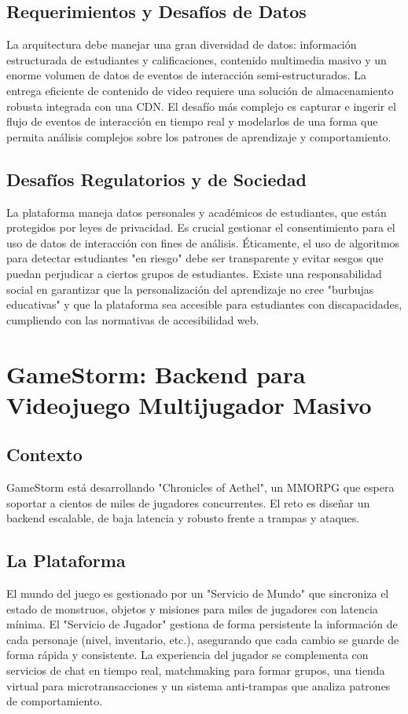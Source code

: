 \documentclass[12pt]{article}
\begin{document}
\subsection{Requerimientos y Desafíos de Datos}
La arquitectura debe manejar una gran diversidad de datos: información estructurada de estudiantes y calificaciones, contenido multimedia masivo y un enorme volumen de datos de eventos de interacción semi-estructurados. La entrega eficiente de contenido de video requiere una solución de almacenamiento robusta integrada con una CDN. El desafío más complejo es capturar e ingerir el flujo de eventos de interacción en tiempo real y modelarlos de una forma que permita análisis complejos sobre los patrones de aprendizaje y comportamiento.

\subsection{Desafíos Regulatorios y de Sociedad}
La plataforma maneja datos personales y académicos de estudiantes, que están protegidos por leyes de privacidad. Es crucial gestionar el consentimiento para el uso de datos de interacción con fines de análisis. Éticamente, el uso de algoritmos para detectar estudiantes "en riesgo" debe ser transparente y evitar sesgos que puedan perjudicar a ciertos grupos de estudiantes. Existe una responsabilidad social en garantizar que la personalización del aprendizaje no cree "burbujas educativas" y que la plataforma sea accesible para estudiantes con discapacidades, cumpliendo con las normativas de accesibilidad web.

\newpage

\section{GameStorm: Backend para Videojuego Multijugador Masivo}

\subsection{Contexto}
GameStorm está desarrollando "Chronicles of Aethel", un MMORPG que espera soportar a cientos de miles de jugadores concurrentes. El reto es diseñar un backend escalable, de baja latencia y robusto frente a trampas y ataques.

\subsection{La Plataforma}
El mundo del juego es gestionado por un "Servicio de Mundo" que sincroniza el estado de monstruos, objetos y misiones para miles de jugadores con latencia mínima. El "Servicio de Jugador" gestiona de forma persistente la información de cada personaje (nivel, inventario, etc.), asegurando que cada cambio se guarde de forma rápida y consistente. La experiencia del jugador se complementa con servicios de chat en tiempo real, matchmaking para formar grupos, una tienda virtual para microtransacciones y un sistema anti-trampas que analiza patrones de comportamiento.
\end{document}
